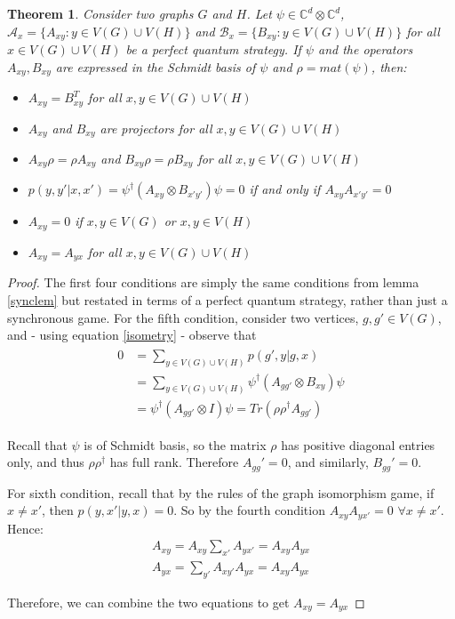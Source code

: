 \documentclass[12pt]{article}
\newtheorem{thm}{Theorem}[section]
\begin{document}
\begin{thm}
\label{syncthm}
Consider two graphs $G$ and $H$. Let $\psi \in \mathbb{C}^d \otimes \mathbb{C}^d$, $\mathcal{A}_x = \{A_{xy}: y \in V(G) \cup V(H)\}$ and $\mathcal{B}_x = \{B_{xy}: y \in V(G) \cup V(H)\}$ for all $x \in V(G) \cup V(H)$ be a perfect quantum strategy. If $\psi$ and the operators $A_{xy}, B_{xy}$ are expressed in the Schmidt basis of $\psi$ and $\rho = mat(\psi)$, then:
\begin{itemize}
\item $A_{xy} = B_{xy}^T$ for all $x, y \in V(G) \cup V(H)$
\item $A_{xy}$ and $B_{xy}$ are projectors for all $x, y \in V(G) \cup V(H)$
\item $A_{xy} \rho = \rho A_{xy}$ and $B_{xy} \rho = \rho B_{xy}$ for all $x, y \in V(G) \cup V(H)$
\item $p(y, y'|x, x') = \psi^{\dag} (A_{xy} \otimes B_{x'y'}) \psi = 0$ if and only if $A_{xy}A_{x'y'} = 0$
\item $A_{xy} = 0$ if $x, y \in V(G)$ or $x, y \in V(H)$
\item $A_{xy} = A_{yx}$ for all $x, y \in V(G) \cup V(H)$
\end{itemize}
\end{thm}
\begin{proof}
The first four conditions are simply the same conditions from lemma \ref{synclem} but restated in terms of a perfect quantum strategy, rather than just a synchronous game. For the fifth condition, consider two vertices, $g, g' \in V(G)$, and - using equation \ref{isometry} - observe that 
\begin{align}
\begin{split}
0 &= \sum_{y \in V(G) \cup V(H)} p(g', y|g, x) \\
  &= \sum_{y \in V(G) \cup V(H)} \psi^{\dag}(A_{gg'} \otimes B_{xy})\psi \\
  &= \psi^{\dag}(A_{gg'} \otimes I)\psi = Tr(\rho \rho^{\dag} A_{gg'})
\end{split}
\end{align}

Recall that $\psi$ is of Schmidt basis, so the matrix $\rho$ has positive diagonal entries only, and thus $\rho \rho^{\dag}$ has full rank. Therefore $A_{gg}' = 0$, and similarly, $B_{gg}' = 0$.

For sixth condition, recall that by the rules of the graph isomorphism game, if $x \neq x'$, then $p(y, x'|y, x) = 0$. So by the fourth condition $A_{xy}A_{yx'} = 0$ $\forall x \neq x'$. Hence: 
\begin{eqnarray}
A_{xy} = A_{xy} \sum_{x'} A_{yx'} = A_{xy}A_{yx} \\
A_{yx} = \sum_{y'} A_{xy'} A_{yx}= A_{xy}A_{yx}
\end{eqnarray}

Therefore, we can combine the two equations to get $A_{xy} = A_{yx}$
\end{proof}
\end{document}
